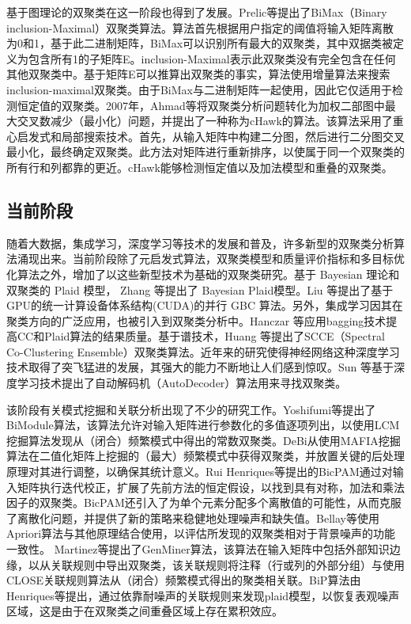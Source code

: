     基于图理论的双聚类在这一阶段也得到了发展。Prelic等提出了BiMax（Binary inclusion-Maximal）双聚类算法。算法首先根据用户指定的阈值将输入矩阵离散为0和1，基于此二进制矩阵，BiMax可以识别所有最大的双聚类，其中双据类被定义为包含所有1的子矩阵E。inclusion-Maximal表示此双聚类没有完全包含在任何其他双聚类中。基于矩阵E可以推算出双聚类的事实，算法使用增量算法来搜索inclusion-maximal双聚类。由于BiMax与二进制矩阵一起使用，因此它仅适用于检测恒定值的双聚类。2007年，Ahmad等将双聚类分析问题转化为加权二部图中最大交叉数减少（最小化）问题，并提出了一种称为cHawk的算法。该算法采用了重心启发式和局部搜索技术。首先，从输入矩阵中构建二分图，然后进行二分图交叉最小化，最终确定双聚类。此方法对矩阵进行重新排序，以使属于同一个双聚类的所有行和列都靠的更近。cHawk能够检测恒定值以及加法模型和重叠的双聚类。

    
    \subsection{当前阶段}
    随着大数据，集成学习，深度学习等技术的发展和普及，许多新型的双聚类分析算法涌现出来。当前阶段除了元启发式算法，双聚类模型和质量评价指标和多目标优化算法之外，增加了以这些新型技术为基础的双聚类研究。基于 Bayesian 理论和双聚类的 Plaid 模型， Zhang 等提出了 Bayesian Plaid模型。Liu 等提出了基于GPU的统一计算设备体系结构(CUDA)的并行 GBC 算法。另外，集成学习因其在聚类方向的广泛应用，也被引入到双聚类分析中。Hanczar 等应用bagging技术提高CC和Plaid算法的结果质量。基于谱技术，Huang 等提出了SCCE（Spectral Co-Clustering Ensemble）双聚类算法。近年来的研究使得神经网络这种深度学习技术取得了突飞猛进的发展，其强大的能力不断地让人们感到惊叹。Sun 等基于深度学习技术提出了自动解码机（AutoDecoder）算法用来寻找双聚类。

    该阶段有关模式挖掘和关联分析出现了不少的研究工作。Yoshifumi等提出了BiModule算法，该算法允许对输入矩阵进行参数化的多值逐项列出，以使用LCM挖掘算法发现从（闭合）频繁模式中得出的常数双聚类。DeBi从使用MAFIA挖掘算法在二值化矩阵上挖掘的（最大）频繁模式中获得双聚类，并放置关键的后处理原理对其进行调整，以确保其统计意义。Rui Henriques等提出的BicPAM通过对输入矩阵执行迭代校正，扩展了先前方法的恒定假设，以找到具有对称，加法和乘法因子的双聚类。BicPAM还引入了为单个元素分配多个离散值的可能性，从而克服了离散化问题，并提供了新的策略来稳健地处理噪声和缺失值。Bellay等使用Apriori算法与其他原理结合使用，以评估所发现的双聚类相对于背景噪声的功能一致性。 Martinez等提出了GenMiner算法，该算法在输入矩阵中包括外部知识边缘，以从关联规则中导出双聚类，该关联规则将注释（行或列的外部分组）与使用CLOSE关联规则算法从（闭合）频繁模式得出的聚类相关联。BiP算法由Henriques等提出，通过依靠耐噪声的关联规则来发现plaid模型，以恢复表观噪声区域，这是由于在双聚类之间重叠区域上存在累积效应。

